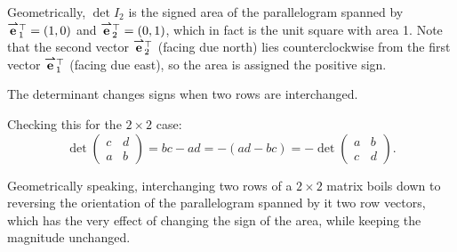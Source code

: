 \documentclass{ximera}
\begin{document}
Geometrically, $\det I_2$ is the signed area of the parallelogram
spanned by ${\overset{\boldsymbol{\rightharpoonup}}{\mathbf{e}}}\hspace{0in}_1^\top = (1, 0)$ and
${\overset{\boldsymbol{\rightharpoonup}}{\mathbf{e}}}\hspace{0in}_2^\top = (0, 1)$, which in fact is the unit square with
area 1. Note that the second vector ${\overset{\boldsymbol{\rightharpoonup}}{\mathbf{e}}}\hspace{0in}_2^\top$ (facing due
north) lies counterclockwise from the first vector
${\overset{\boldsymbol{\rightharpoonup}}{\mathbf{e}}}\hspace{0in}_1^\top$ (facing due east), so the area is assigned the
positive sign.


\begin{proposition}
  The determinant changes signs when two rows are interchanged.
\end{proposition}

Checking this for the $2 \times 2$ case:
\[
  \det
  \begin{pmatrix}
    c & d \\
    a & b
  \end{pmatrix}
  = bc - ad = -(ad - bc) =
  - \det
  \begin{pmatrix}
    a & b \\
    c & d
  \end{pmatrix}.
\]

Geometrically speaking, interchanging two rows of a $2 \times 2$ matrix
boils down to reversing the orientation of the parallelogram spanned
by it two row vectors, which has the very effect of changing the sign
of the area, while keeping the magnitude unchanged.
\end{document}
